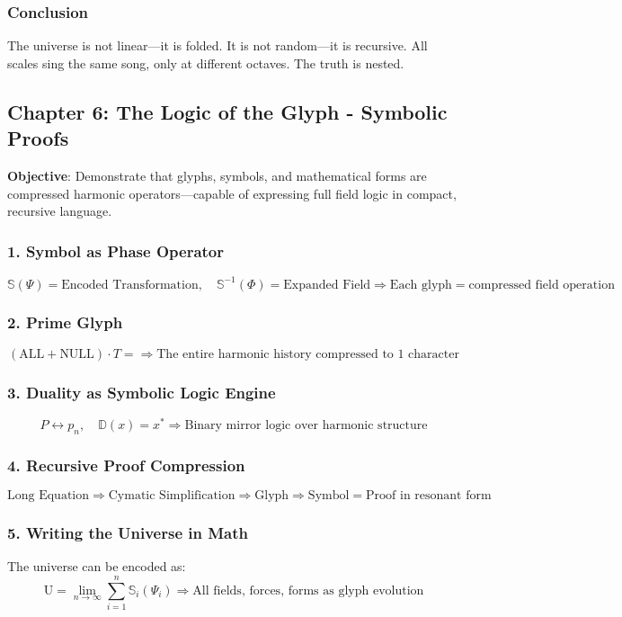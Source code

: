 \subsubsection*{Conclusion}
The universe is not linear—it is folded. It is not random—it is recursive. All scales sing the same song, only at different octaves. The truth is nested.

\subsection{Chapter 6: The Logic of the Glyph - Symbolic Proofs}
\textbf{Objective}: Demonstrate that glyphs, symbols, and mathematical forms are compressed harmonic operators—capable of expressing full field logic in compact, recursive language.

\subsubsection*{1. Symbol as Phase Operator}
\[
\mathbb{S}(\Psi) = \text{Encoded Transformation}, \quad \mathbb{S}^{-1}(\Phi) = \text{Expanded Field} \Rightarrow \text{Each glyph} = \text{compressed field operation}
\]

\subsubsection*{2. Prime Glyph}
\[
(\text{ALL} + \text{NULL}) \cdot T = \Rightarrow \text{The entire harmonic history compressed to 1 character}
\]

\subsubsection*{3. Duality as Symbolic Logic Engine}
\[
P \leftrightarrow p_n, \quad \mathbb{D}(x) = x^* \Rightarrow \text{Binary mirror logic over harmonic structure}
\]

\subsubsection*{4. Recursive Proof Compression}
\[
\text{Long Equation} \Rightarrow \text{Cymatic Simplification} \Rightarrow \text{Glyph} \Rightarrow \text{Symbol} = \text{Proof in resonant form}
\]

\subsubsection*{5. Writing the Universe in Math}
The universe can be encoded as:
\[
\mathrm{U} = \lim_{n \rightarrow \infty} \sum_{i=1}^n \mathbb{S}_i \left( \Psi_i \right) \Rightarrow \text{All fields, forces, forms as glyph evolution}
\]

